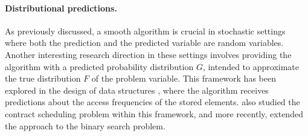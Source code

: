 \paragraph{Distributional predictions.} 
As previously discussed, a smooth algorithm is crucial in stochastic settings where both the prediction and the predicted variable are random variables. Another interesting research direction in these settings involves providing the algorithm with a predicted probability distribution \( G \), intended to approximate the true distribution \( F \) of the problem variable. This framework has been explored in the design of data structures \cite{}, where the algorithm receives predictions about the access frequencies of the stored elements. \cite{angelopoulos_contract_2024} also studied the contract scheduling problem within this framework, and more recently, \cite{dinitz_binary_2024} extended the approach to the binary search problem.









